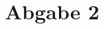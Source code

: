 \documentclass[12pt,a4paper,bibliography=totocnumbered]{scrartcl}
\begin{document}

\pagestyle{fancy}
\renewcommand{\sectionmark}[1]{\markright{\arabic{section}.\ #1}}
\renewcommand{\leftmark}{}
\fancyhf{}
\lhead{}
\chead{}
\rhead{\thesection\space\contentsname}
\cfoot{}
\rfoot{\ \linebreak  \thepage}
\renewcommand{\headrulewidth}{0.4pt}
\renewcommand{\footrulewidth}{0.4pt}




\clearpage

\setcounter{page}{1}

\fancyhead[LE,RO]{\rightmark}
\fancyfoot[LE,RO]{\thepage}


\section*{Abgabe 2}
\end{document}
